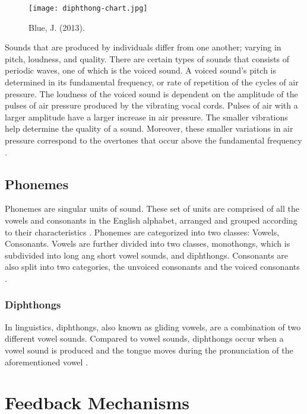 \begin{figure}[ht]
    \centering
    \texttt{[image: diphthong-chart.jpg]}
    \caption{Blue, J. (2013). }
    \cite{usingphonemes:img}
    \label{fig:diphthong-chart}
\end{figure}

Sounds that are produced by individuals differ from one another; varying in pitch, loudness, and quality. There are certain types of sounds that consists of periodic waves, one of which is the voiced sound. A voiced sound's pitch is determined in its fundamental frequency, or rate of repetition of the cycles of air pressure. The loudness of the voiced sound is dependent on the amplitude of the pulses of air pressure produced by the vibrating vocal cords. Pulses of air with a larger amplitude have a larger increase in air pressure. The smaller vibrations help determine the quality of a sound. Moreover, these smaller variations in air pressure correspond to the overtones that occur above the fundamental frequency \cite{britannica:2014:acoustic-phoetics}. 

\subsection{Phonemes}
Phonemes are singular units of sound. These set of units are comprised of all the vowels and consonants in the English alphabet, arranged and grouped according to their characteristics \cite{wikipedia:2014:phoneme}. Phonemes are categorized into two classes: Vowels, Consonants. Vowels are further divided into two classes, monothongs, which is subdivided into long ang short vowel sounds, and diphthongs. Consonants are also split into two categories, the unvoiced consonants and the voiced consonants \cite{jadeblue:2013:phonemic-chart}. 

\subsubsection{Diphthongs}
In linguistics, diphthongs, also known as gliding vowels, are a combination of two different vowel sounds. Compared to vowel sounds, diphthongs occur when a vowel sound is produced and the tongue moves during the pronunciation of the aforementioned vowel \cite{britannica:2015:diphthongs}.

\section{Feedback Mechanisms}

